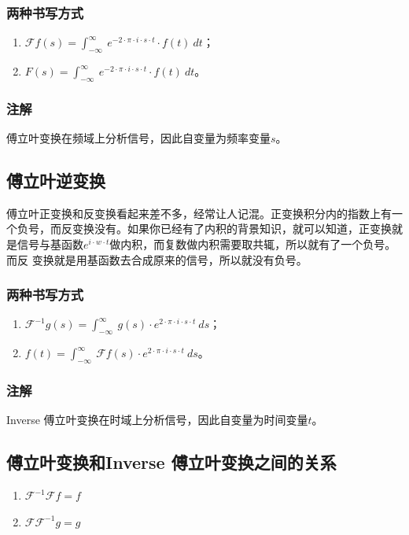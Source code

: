 \subsubsection{两种书写方式}
\begin{enumerate}
	\item $\mathcal{F}f(s)=\int_{-\infty}^{\infty}\ e^{-2\cdot \pi\cdot i\cdot s\cdot t}\cdot f(t)\ dt$；
	\item $F(s)=\int_{-\infty}^{\infty}\ e^{-2\cdot \pi\cdot i\cdot s\cdot t}\cdot f(t)\ dt$。
\end{enumerate}
\subsubsection{注解}
傅立叶变换在频域上分析信号，因此自变量为频率变量$s$。
\subsection{傅立叶逆变换}
傅立叶正变换和反变换看起来差不多，经常让人记混。正变换积分内的指数上有一个负号，而反变换没有。如果你已经有了内积的背景知识，就可以知道，正变换就是信号与基函数$e^{i\cdot w\cdot t}$做内积，而复数做内积需要取共辄，所以就有了一个负号。而反 变换就是用基函数去合成原来的信号，所以就没有负号。
\subsubsection{两种书写方式}
\begin{enumerate}
	\item $\mathcal{F}^{-1}g(s)=\int_{-\infty}^{\infty}\ g(s)\cdot e^{2\cdot \pi\cdot i\cdot s\cdot t}\ ds$；
	\item $f(t)=\int_{-\infty}^{\infty}\ \mathcal{F}f(s)\cdot e^{2\cdot \pi\cdot i\cdot s\cdot t}\ ds$。
\end{enumerate}
\subsubsection{注解}
Inverse 傅立叶变换在时域上分析信号，因此自变量为时间变量$t$。
\subsection{傅立叶变换和Inverse 傅立叶变换之间的关系}
\begin{enumerate}
	\item $\mathcal{F}^{-1}\mathcal{F}f=f$
	\item $\mathcal{F}\mathcal{F}^{-1}g=g$
\end{enumerate}
